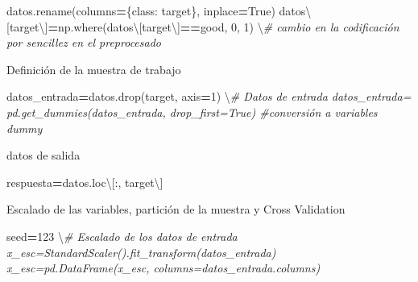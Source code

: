 \documentclass[
  a4paper,
  DIV=11,
  numbers=noendperiod]{scrreprt}
\newenvironment{Shaded}{\begin{snugshade}}{\end{snugshade}}
\newcommand{\CommentTok}[1]{\textcolor[rgb]{0.56,0.35,0.01}{\textit{#1}}}
\newcommand{\DecValTok}[1]{\textcolor[rgb]{0.00,0.00,0.81}{#1}}
\newcommand{\NormalTok}[1]{\textcolor[rgb]{0.00,0.00,0.00}{#1}}
\newcommand{\OperatorTok}[1]{\textcolor[rgb]{0.81,0.36,0.00}{\textbf{#1}}}
\newcommand{\StringTok}[1]{\textcolor[rgb]{0.31,0.60,0.02}{#1}}
\newcommand{\VariableTok}[1]{\textcolor[rgb]{0.00,0.00,0.00}{#1}}
\begin{document}
\begin{Shaded}
\begin{Highlighting}[numbers=left,,]
\NormalTok{datos.rename(columns}\OperatorTok{=}\NormalTok{\{}\StringTok{\textquotesingle{}class\textquotesingle{}}\NormalTok{: }\StringTok{\textquotesingle{}target\textquotesingle{}}\NormalTok{\}, inplace}\OperatorTok{=}\VariableTok{True}\NormalTok{) datos\textbackslash{}[}\StringTok{\textquotesingle{}target\textquotesingle{}}\NormalTok{\textbackslash{}]}\OperatorTok{=}\NormalTok{np.where(datos\textbackslash{}[}\StringTok{\textquotesingle{}target\textquotesingle{}}\NormalTok{\textbackslash{}]}\OperatorTok{==}\StringTok{\textquotesingle{}good\textquotesingle{}}\NormalTok{, }\DecValTok{0}\NormalTok{, }\DecValTok{1}\NormalTok{) \textbackslash{}}\CommentTok{\# cambio en la codificación por sencillez en el preprocesado}
\end{Highlighting}
\end{Shaded}

Definición de la muestra de trabajo

\begin{Shaded}
\begin{Highlighting}[numbers=left,,]
\NormalTok{datos\_entrada}\OperatorTok{=}\NormalTok{datos.drop(}\StringTok{\textquotesingle{}target\textquotesingle{}}\NormalTok{, axis}\OperatorTok{=}\DecValTok{1}\NormalTok{) \textbackslash{}}\CommentTok{\# Datos de entrada datos\_entrada= pd.get\_dummies(datos\_entrada, drop\_first=True) \#conversión a variables dummy}
\end{Highlighting}
\end{Shaded}

datos de salida

\begin{Shaded}
\begin{Highlighting}[numbers=left,,]
\NormalTok{respuesta}\OperatorTok{=}\NormalTok{datos.loc\textbackslash{}[:, }\StringTok{\textquotesingle{}target\textquotesingle{}}\NormalTok{\textbackslash{}]}
\end{Highlighting}
\end{Shaded}

Escalado de las variables, partición de la muestra y Cross Validation

\begin{Shaded}
\begin{Highlighting}[numbers=left,,]
\NormalTok{seed}\OperatorTok{=}\DecValTok{123}\NormalTok{ \textbackslash{}}\CommentTok{\# Escalado de los datos de entrada x\_esc=StandardScaler().fit\_transform(datos\_entrada) x\_esc=pd.DataFrame(x\_esc, columns=datos\_entrada.columns)}
\end{Highlighting}
\end{Shaded}
\end{document}
